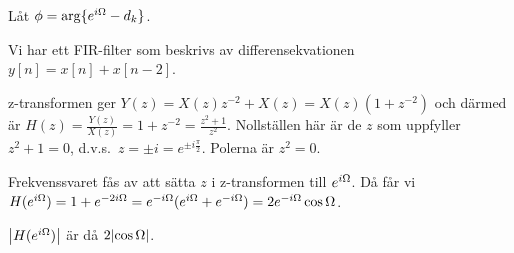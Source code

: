 \documentclass[a4paper]{article}
\begin{document}
Låt \(
    \phi = \arg\{e^{i\Omega} - d_k\}
\). 

\begin{ex}
    Vi har ett FIR-filter som beskrivs av differensekvationen \(
        y[n] = x[n] + x[n-2]
    \).

    z-transformen ger \(
        Y(z) = X(z) z^{-2} + X(z) = X(z) (1+z^{-2})
    \) och därmed är \(
        H(z) = \frac{Y(z)}{X(z)} = 1 + z^{-2} = \frac{z^2+1}{z^2}  
    \). Nollställen här är de \(
        z
    \) som uppfyller \(
        z^2 + 1 = 0
    \), d.v.s.\ \(
        z = \pm i = e^{\pm i \frac{\pi}{2} }
    \). Polerna är \(
        z^2 = 0
    \).

    Frekvenssvaret fås av att sätta \(
        z
    \) i z-transformen till \(
        e^{i\Omega}
    \). Då får vi \(
        H(e^{i\Omega}) = 1 + e^{-2{i\Omega}}
            = e^{-{i\Omega}}(e^{i\Omega} + e^{-{i\Omega}})
            = 2 e^{-{i\Omega}} \cos \Omega
    \).

    \(
        \abs{H(e^{i\Omega})}
    \) är då \(
        2 \abs{\cos \Omega}
    \).
\end{ex}
\end{document}
